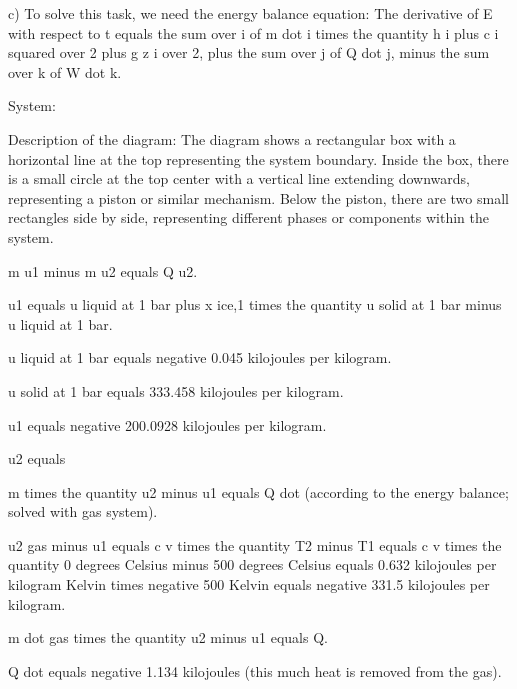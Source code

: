 c) To solve this task, we need the energy balance equation:
The derivative of E with respect to t equals the sum over i of m dot i times the quantity h i plus c i squared over 2 plus g z i over 2, plus the sum over j of Q dot j, minus the sum over k of W dot k.

System:

Description of the diagram: The diagram shows a rectangular box with a horizontal line at the top representing the system boundary. Inside the box, there is a small circle at the top center with a vertical line extending downwards, representing a piston or similar mechanism. Below the piston, there are two small rectangles side by side, representing different phases or components within the system.

m u1 minus m u2 equals Q u2.

u1 equals u liquid at 1 bar plus x ice,1 times the quantity u solid at 1 bar minus u liquid at 1 bar.

u liquid at 1 bar equals negative 0.045 kilojoules per kilogram.

u solid at 1 bar equals 333.458 kilojoules per kilogram.

u1 equals negative 200.0928 kilojoules per kilogram.

u2 equals

m times the quantity u2 minus u1 equals Q dot (according to the energy balance; solved with gas system).

u2 gas minus u1 equals c v times the quantity T2 minus T1 equals c v times the quantity 0 degrees Celsius minus 500 degrees Celsius equals 0.632 kilojoules per kilogram Kelvin times negative 500 Kelvin equals negative 331.5 kilojoules per kilogram.

m dot gas times the quantity u2 minus u1 equals Q.

Q dot equals negative 1.134 kilojoules (this much heat is removed from the gas).